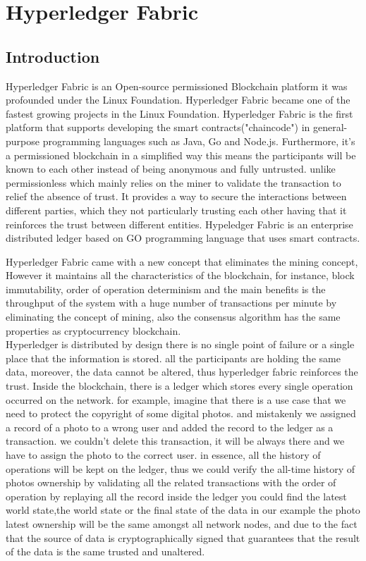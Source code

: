 \section{Hyperledger Fabric}
 
\subsection{Introduction}
Hyperledger Fabric is an Open-source permissioned Blockchain platform it was profounded under the Linux Foundation. Hyperledger Fabric became one of the fastest growing projects in the Linux Foundation. 
Hyperledger Fabric is the first platform that supports developing the smart contracts("chaincode") in general-purpose programming languages such as Java, Go and Node.js.
Furthermore, it's a permissioned blockchain in a simplified way this means the participants will be known to each other instead of being anonymous and fully untrusted. unlike permissionless which mainly relies on the miner to validate the transaction to relief the absence of trust. 
It provides a way to secure the interactions between different parties, which they not particularly trusting each other having that it reinforces the trust between different entities.
Hypeledger Fabric is an enterprise distributed ledger based on GO programming language that uses smart contracts. 

Hyperledger Fabric came with a new concept that eliminates the mining concept, However it maintains all the characteristics of the blockchain, for instance, block immutability, order of operation determinism and the main benefits is the throughput of the system with a huge number of transactions per minute by eliminating the concept of mining, also the consensus algorithm has the same properties as cryptocurrency blockchain. \\ 

Hyperledger is distributed by design there is no single point of failure or a single place that the information is stored.
all the participants are holding the same data, moreover, the data cannot be altered, thus hyperledger fabric reinforces the trust. 
Inside the blockchain, there is a ledger which stores every single operation occurred on the network. 
for example, imagine that there is a use case that we need to protect the copyright of some digital photos. and mistakenly we assigned a record of a photo to a wrong user and added the record to the ledger as a transaction. we couldn't delete this transaction, it will be always there and we have to assign the photo to the correct user. in essence, all the history of operations will be kept on the ledger, thus we could verify the all-time history of photos ownership by validating all the related transactions with the order of operation by replaying all the record inside the ledger you could find the latest world state,the world state or the final state of the data in our example the photo latest ownership will be the same amongst all network nodes, and due to the fact that the source of data is cryptographically signed that guarantees that the result of the data is the same trusted and unaltered. \\ 

